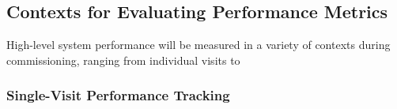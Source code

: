 \documentclass[DM,lsstdraft,toc]{lsstdoc}
\begin{document}












\subsection{Contexts for Evaluating Performance Metrics}

High-level system performance will be measured in a variety of contexts during commissioning, ranging from individual visits to 

\subsubsection{Single-Visit Performance Tracking}
\end{document}

